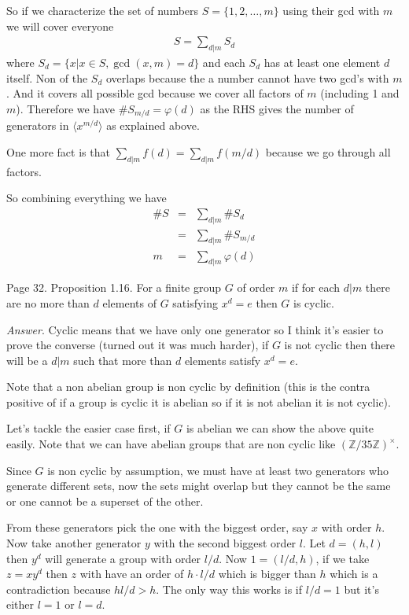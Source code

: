 \documentclass[aps,preprint,preprintnumbers,nofootinbib,showpacs,prd]{revtex4-1}
\newcommand{\nbea}{\begin{eqnarray*}}
\newcommand{\neea}{\end{eqnarray*}}
\begin{document}
So if we characterize the set of numbers $S = \{1,2,\dots, m\}$ using their gcd with $m$ we will cover everyone 
%
\nbea
S = \sum_{d|m} S_d
\neea
%
where $S_d = \{x | x \in S, \gcd(x,m) = d\}$ and each $S_d$ has at least one element $d$ itself. Non of the $S_d$ overlaps because the a number cannot have two gcd's with $m$. And it covers all possible gcd because we cover all factors of $m$ (including 1 and $m$). Therefore we have $\#S_{m/d} = \varphi(d)$ as the RHS gives the number of generators in $\langle x^{m/d} \rangle$ as explained above. 

One more fact is that $\sum_{d|m} f(d) = \sum_{d|m} f(m/d)$ because we go through all factors. 

So combining everything we have 
%
\nbea
\#S & = & \sum_{d|m} \#S_d \\
& = & \sum_{d|m} \#S_{m/d} \\
m & = & \sum_{d|m} \varphi(d) 
\neea
%

Page 32. Proposition 1.16. For a finite group $G$ of order $m$ if for each $d|m$ there are no more than $d$ elements of $G$ satisfying $x^d = e$ then $G$ is cyclic. 

{\it Answer}. Cyclic means that we have only one generator so I think it's easier to prove the converse (turned out it was much harder), if $G$ is not cyclic then there will be a $d|m$ such that more than $d$ elements satisfy $x^d = e$. 

Note that a non abelian group is non cyclic by definition (this is the contra positive of if a group is cyclic it is abelian so if it is not abelian it is not cyclic). 

Let's tackle the easier case first, if $G$ is abelian we can show the above quite easily. Note that we can have abelian groups that are non cyclic like $(\mathbb{Z}/35\mathbb{Z})^{\times}$.   

Since $G$ is non cyclic by assumption, we must have at least two generators who generate different sets, now the sets might overlap but they cannot be the same or one cannot be a superset of the other. 

From these generators pick the one with the biggest order, say $x$ with order $h$. Now take another generator $y$ with the second biggest order $l$. Let $d = (h,l)$ then $y^{d}$ will generate a group with order $l/d$. Now $1 = (l/d,h)$, if we take $z = x y^{d}$ then $z$ with have an order of $h \cdot l/d$ which is bigger than $h$ which is a contradiction because $h l/d > h$. The only way this works is if $l/d = 1$ but it's either $l = 1$ or $l = d$. 
\end{document}
